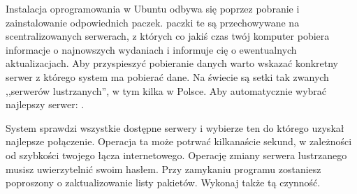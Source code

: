Instalacja oprogramowania w Ubuntu odbywa się poprzez pobranie i zainstalowanie odpowiednich paczek. paczki te są przechowywane na scentralizowanych serwerach, z których co jakiś czas twój komputer pobiera informacje o najnowszych wydaniach i informuje cię o ewentualnych aktualizacjach. Aby przyspieszyć pobieranie danych warto wskazać konkretny serwer z którego system ma pobierać dane. Na świecie są setki tak zwanych ,,serwerów lustrzanych'', w tym kilka w Polsce. Aby automatycznie wybrać najlepszy serwer: .

System sprawdzi wszystkie dostępne serwery i wybierze ten do którego uzyskał najlepsze połączenie. Operacja ta może potrwać kilkanaście sekund, w zależności od szybkości twojego łącza internetowego. Operację zmiany serwera lustrzanego musisz uwierzytelnić swoim hasłem. Przy zamykaniu programu zostaniesz poproszony o zaktualizowanie listy pakietów. Wykonaj także tą czynność.
